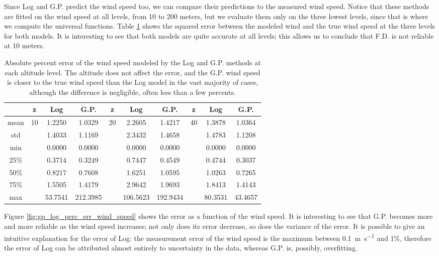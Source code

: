 \documentclass[12pt]{book}
\begin{document}
Since Log and G.P. predict the wind speed too, we can compare their predictions to the measured wind speed. Notice that these methods are fitted on the wind speed at all levels, from 10 to 200 meters, but we evaluate them only on the three lowest levels, since that is where we compute the universal functions. Table \ref{tbl:model_wind_errors} shows the squared error between the modeled wind and the true wind speed at the three levels for both models. It is interesting to see that both models are quite accurate at all levels; this allows us to conclude that F.D. is not reliable at 10 meters.

\begin{table}[]
\centering
\caption{Absolute percent error of the wind speed modeled by the Log and G.P. methods at each altitude level. The altitude does not affect the error, and the G.P. wind speed is closer to the true wind speed than the Log model in the vast majority of cases, although the difference is negligible, often less than a few percents.}
\label{tbl:model_wind_errors}
\begin{tabular}{c|ccc|ccc|ccc}
& z & Log & G.P. & z & Log & G.P. & z & Log & G.P. \\\hline
mean & \multirow{7}{*}{ 10 } & 1.2250 & 1.0329 & \multirow{7}{*}{ 20 } & 2.2605 & 1.4217 & \multirow{7}{*}{ 40 } & 1.3878 & 1.0364 \\
std & & 1.4033 & 1.1169 & & 2.3432 & 1.4658 & & 1.4783 & 1.1208 \\
min & & 0.0000 & 0.0000 & & 0.0000 & 0.0000 & & 0.0000 & 0.0000 \\
25\% & & 0.3714 & 0.3249 & & 0.7447 & 0.4549 & & 0.4744 & 0.3037 \\
50\% & & 0.8217 & 0.7608 & & 1.6251 & 1.0595 & & 1.0263 & 0.7265 \\
75\% & & 1.5505 & 1.4179 & & 2.9642 & 1.9693 & & 1.8413 & 1.4143 \\
max & & 53.7541 & 212.3985 & & 106.5623 & 192.9434 & & 80.3531 & 43.4657 \\
\end{tabular} 
\end{table}


Figure \ref{fig:gp_log_perc_err_wind_speed} shows the error as a function of the wind speed. It is interesting to see that G.P. becomes more and more reliable as the wind speed increases; not only does its error decrease, so does the variance of the error. It is possible to give an intuitive explanation for the error of Log: the measurement error of the wind speed is the maximum between \SI{0.1}{\meter\per\second} and 1\%, therefore the error of Log can be attributed almost entirely to uncertainty in the data, whereas G.P. is, possibly, overfitting.
\end{document}
